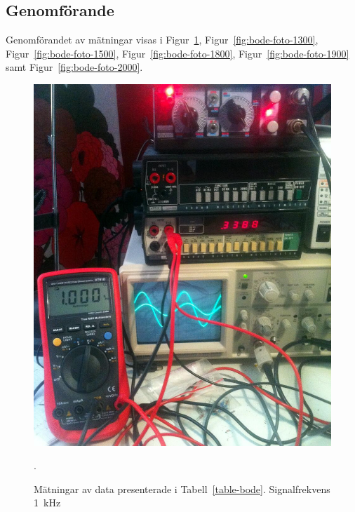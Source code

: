 \subsection{Genomförande}
Genomförandet av mätningar visas i Figur~\ref{fig:bode-foto-1000},
Figur~\ref{fig:bode-foto-1300}, Figur~\ref{fig:bode-foto-1500},
Figur~\ref{fig:bode-foto-1800}, Figur~\ref{fig:bode-foto-1900} samt
Figur~\ref{fig:bode-foto-2000}.


\begin{figure}
  \centering
  \includegraphics[width=\linewidth]{img/bode_1000Hz.jpg}
  \caption[] {Mätningar av data presenterade i Tabell~\ref{table-bode}.
              Signalfrekvens \SI{1}{\kHz}}.
  \label{fig:bode-foto-1000}
\end{figure}

